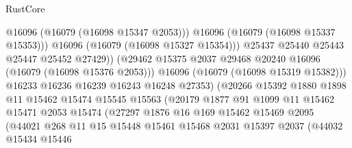 \begin{lexlean}{RustCore}
\begin{coremodule}
                                        @16096
                                        (@16079 (@16098 @15347 @2053)))
                                      @16096
                                      (@16079 (@16098 @15337 @15353)))
                                    @16096
                                    (@16079 (@16098 @15327 @15354)))
                                  @25437
                                  @25440
                                  @25443
                                  @25447
                                  @25452
                                  @27429))
                              (@29462
                                @15375
                                @2037
                                @29468
                                @20240
                                @16096
                                (@16079 (@16098 @15376 @2053)))
                              @16096
                              (@16079 (@16098 @15319 @15382)))
                            @16233
                            @16236
                            @16239
                            @16243
                            @16248
                            @27353)
                          (@20266
                            @15392
                            @1880
                            @1898
                            @11
                            @15462
                            @15474
                            @15545
                            @15563
                            (@20179
                              @1877
                              @91
                              @1099
                              @11
                              @15462
                              @15471
                              @2053
                              @15474
                              (@27297
                                @1876
                                @16
                                @169
                                @15462
                                @15469
                                @2095
                                (@44021
                                  @268
                                  @11
                                  @15
                                  @15448
                                  @15461
                                  @15468
                                  @2031
                                  @15397
                                  @2037
                                  (@44032
                                    @15434
                                    @15446

\end{coremodule}
\end{lexlean}
